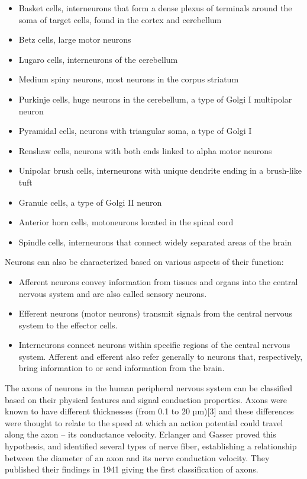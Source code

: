 \documentclass[]{book}
\providecommand{\tightlist}{%
  \setlength{\itemsep}{0pt}\setlength{\parskip}{0pt}}
\begin{document}
\begin{itemize}
\tightlist
\item
  Basket cells, interneurons that form a dense plexus of terminals around the soma of target cells, found in the cortex and cerebellum
\item
  Betz cells, large motor neurons
\item
  Lugaro cells, interneurons of the cerebellum
\item
  Medium spiny neurons, most neurons in the corpus striatum
\item
  Purkinje cells, huge neurons in the cerebellum, a type of Golgi I multipolar neuron
\item
  Pyramidal cells, neurons with triangular soma, a type of Golgi I
\item
  Renshaw cells, neurons with both ends linked to alpha motor neurons
\item
  Unipolar brush cells, interneurons with unique dendrite ending in a brush-like tuft
\item
  Granule cells, a type of Golgi II neuron
\item
  Anterior horn cells, motoneurons located in the spinal cord
\item
  Spindle cells, interneurons that connect widely separated areas of the brain
\end{itemize}

Neurons can also be characterized based on various aspects of their function:

\begin{itemize}
\tightlist
\item
  Afferent neurons convey information from tissues and organs into the central nervous system and are also called sensory neurons.
\item
  Efferent neurons (motor neurons) transmit signals from the central nervous system to the effector cells.
\item
  Interneurons connect neurons within specific regions of the central nervous system.
  Afferent and efferent also refer generally to neurons that, respectively, bring information to or send information from the brain.
\end{itemize}

The axons of neurons in the human peripheral nervous system can be classified based on their physical features and signal conduction properties. Axons were known to have different thicknesses (from 0.1 to 20 µm){[}3{]} and these differences were thought to relate to the speed at which an action potential could travel along the axon -- its conductance velocity. Erlanger and Gasser proved this hypothesis, and identified several types of nerve fiber, establishing a relationship between the diameter of an axon and its nerve conduction velocity. They published their findings in 1941 giving the first classification of axons.
\end{document}
